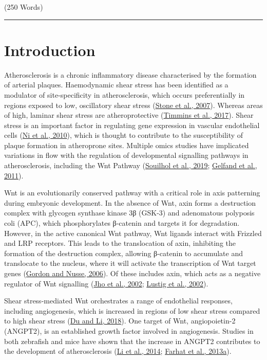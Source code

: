 \documentclass[
  11pt,
]{article}
\begin{document}
\begin{flushright}
(250 Words)\\
\end{flushright}
\rule{\textwidth}{0.4pt}

\hypertarget{introduction}{%
\section{Introduction}\label{introduction}}

Atherosclerosis is a chronic inflammatory disease characterised by the formation of arterial plaques.
Haemodynamic shear stress has been identified as a modulator of site-specificity in atherosclerosis, which occurs preferentially in regions exposed to low, oscillatory shear stress (\protect\hyperlink{ref-stone2007}{Stone et al., 2007}). Whereas areas of high, laminar shear stress are atheroprotective (\protect\hyperlink{ref-timmins2017}{Timmins et al., 2017}). Shear stress is an important factor in regulating gene expression in vascular endothelial cells (\protect\hyperlink{ref-Ni2010}{Ni et al., 2010}), which is thought to contribute to the susceptibility of plaque formation in atheroprone sites. Multiple omics studies have implicated variations in flow with the regulation of developmental signalling pathways in atherosclerosis, including the Wnt Pathway (\protect\hyperlink{ref-Souilhol2020}{Souilhol et al., 2019}; \protect\hyperlink{ref-Gelfand2011}{Gelfand et al., 2011}).

Wnt is an evolutionarily conserved pathway with a critical role in axis patterning during embryonic development.
In the absence of Wnt, axin forms a destruction complex with glycogen synthase kinase 3β (GSK-3) and adenomatous polyposis coli (APC), which phosphorylates β-catenin and targets it for degradation.
However, in the active canonical Wnt pathway, Wnt ligands interact with Frizzled and LRP receptors.
This leads to the translocation of axin, inhibiting the formation of the destruction complex, allowing β-catenin to accumulate and translocate to the nucleus, where it will activate the transcription of Wnt target genes (\protect\hyperlink{ref-gordon2006}{Gordon and Nusse, 2006}). Of these includes axin, which acts as a negative regulator of Wnt signalling (\protect\hyperlink{ref-Jho2002}{Jho et al., 2002}; \protect\hyperlink{ref-Lustig2002}{Lustig et al., 2002}).

Shear stress-mediated Wnt orchestrates a range of endothelial responses, including angiogenesis, which is increased in regions of low shear stress compared to high shear stress (\protect\hyperlink{ref-du2018}{Du and Li, 2018}). One target of Wnt, angiopoietin-2 (ANGPT2), is an established growth factor involved in angiogenesis. Studies in both zebrafish and mice have shown that the increase in ANGPT2 contributes to the development of atherosclerosis (\protect\hyperlink{ref-Li2014-mx}{Li et al., 2014}; \protect\hyperlink{ref-farhat2013}{Farhat et al., 2013a}).
\end{document}
